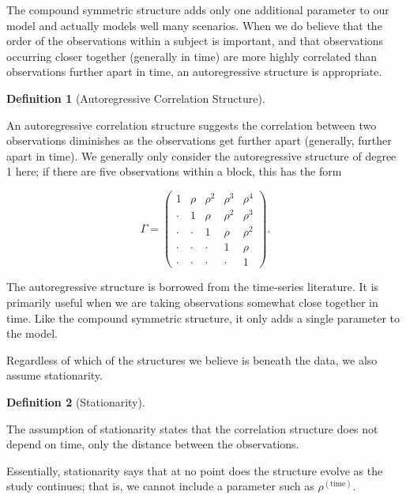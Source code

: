 \documentclass[
  letterpaper,
  DIV=11,
  numbers=noendperiod]{scrreprt}
\theoremstyle{definition}
\newtheorem{definition}{Definition}[chapter]
\theoremstyle{definition}
\theoremstyle{remark}
\begin{document}
The compound symmetric structure adds only one additional parameter to
our model and actually models well many scenarios. When we do believe
that the order of the observations within a subject is important, and
that observations occurring closer together (generally in time) are more
highly correlated than observations further apart in time, an
autoregressive structure is appropriate.

\begin{definition}[Autoregressive Correlation
Structure]\protect\hypertarget{def-autoregressive-correlation-structure}{}\label{def-autoregressive-correlation-structure}

An autoregressive correlation structure suggests the correlation between
two observations diminishes as the observations get further apart
(generally, further apart in time). We generally only consider the
autoregressive structure of degree 1 here; if there are five
observations within a block, this has the form

\[\Gamma = \begin{pmatrix} 
1 & \rho & \rho^2 & \rho^3 & \rho^4 \\
\cdot & 1 & \rho & \rho^2 & \rho^3 \\
\cdot & \cdot & 1 & \rho & \rho^2 \\
\cdot & \cdot & \cdot & 1 & \rho \\
\cdot & \cdot & \cdot & \cdot & 1 \end{pmatrix}.\]

\end{definition}

The autoregressive structure is borrowed from the time-series
literature. It is primarily useful when we are taking observations
somewhat close together in time. Like the compound symmetric structure,
it only adds a single parameter to the model.

Regardless of which of the structures we believe is beneath the data, we
also assume stationarity.

\begin{definition}[Stationarity]\protect\hypertarget{def-stationarity}{}\label{def-stationarity}

The assumption of stationarity states that the correlation structure
does not depend on time, only the distance between the observations.

\end{definition}

Essentially, stationarity says that at no point does the structure
evolve as the study continues; that is, we cannot include a parameter
such as \(\rho^{(\text{time})}\).
\end{document}

